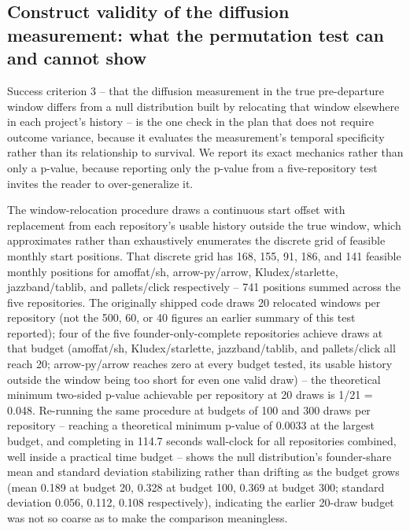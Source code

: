 \documentclass[11pt,letterpaper]{article}
\begin{document}
\subsection{Construct validity of the diffusion measurement: what the permutation test can and cannot show}

Success criterion 3 -- that the diffusion measurement in the true pre-departure window differs from a null distribution built by relocating that window elsewhere in each project's history -- is the one check in the plan that does not require outcome variance, because it evaluates the measurement's temporal specificity rather than its relationship to survival. We report its exact mechanics rather than only a p-value, because reporting only the p-value from a five-repository test invites the reader to over-generalize it.

The window-relocation procedure draws a continuous start offset with replacement from each repository's usable history outside the true window, which approximates rather than exhaustively enumerates the discrete grid of feasible monthly start positions. That discrete grid has 168, 155, 91, 186, and 141 feasible monthly positions for amoffat/sh, arrow-py/arrow, Kludex/starlette, jazzband/tablib, and pallets/click respectively -- 741 positions summed across the five repositories. The originally shipped code draws 20 relocated windows per repository (not the 500, 60, or 40 figures an earlier summary of this test reported); four of the five founder-only-complete repositories achieve draws at that budget (amoffat/sh, Kludex/starlette, jazzband/tablib, and pallets/click all reach 20; arrow-py/arrow reaches zero at every budget tested, its usable history outside the window being too short for even one valid draw) -- the theoretical minimum two-sided p-value achievable per repository at 20 draws is 1/21 = 0.048. Re-running the same procedure at budgets of 100 and 300 draws per repository -- reaching a theoretical minimum p-value of 0.0033 at the largest budget, and completing in 114.7 seconds wall-clock for all repositories combined, well inside a practical time budget -- shows the null distribution's founder-share mean and standard deviation stabilizing rather than drifting as the budget grows (mean 0.189 at budget 20, 0.328 at budget 100, 0.369 at budget 300; standard deviation 0.056, 0.112, 0.108 respectively), indicating the earlier 20-draw budget was not so coarse as to make the comparison meaningless.
\end{document}
